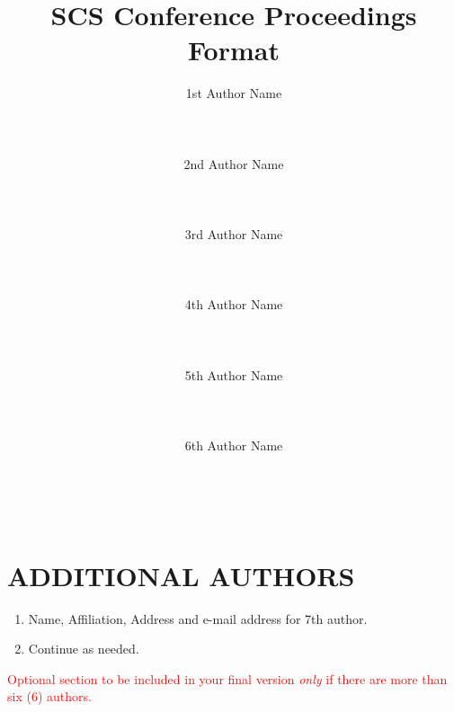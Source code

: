 \documentclass{scsPaperFormattingTemplate-LaTex-Revised20160302}
\begin{document}
\title{SCS Conference Proceedings Format}

\author{
  \alignauthor 1st Author Name\\
    \\
    \\
    \\
    \affaddr{}
  \alignauthor 2nd Author Name\\
    \\
    \\
    \\
    \affaddr{}
  \alignauthor 3rd Author Name\\
    \\
    \\
    \\
    \affaddr{}
  \alignauthor 4th Author Name\\
	\\
	\\
	\\
	\affaddr{}
  \alignauthor 5th Author Name\\
	\\
	\\
	\\
	\affaddr{}
  \alignauthor 6th Author Name\\
	\\
	\\
	\\
	\affaddr{}
}

\maketitle

\section*{ADDITIONAL AUTHORS}
\begin{enumerate}
	\item Name, Affiliation, Address and e-mail address for 7th author.
	\item Continue as needed. 
\end{enumerate}
\textcolor{red}{Optional section to be included in your final version \textit{only} if there are more than six (6) authors.}
\end{document}
